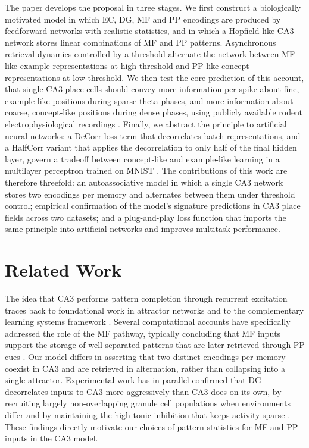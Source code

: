\documentclass[11pt]{article}
\begin{document}
The paper develops the proposal in three stages. We first construct a
biologically motivated model in which EC, DG, MF and PP encodings are
produced by feedforward networks with realistic statistics, and in which a
Hopfield-like CA3 network \cite{hopfield1982neural,tsodyks1988enhanced}
stores linear combinations of MF and PP patterns. Asynchronous retrieval
dynamics controlled by a threshold \cite{amit1985spin} alternate the network
between MF-like example representations at high threshold and PP-like
concept representations at low threshold. We then test the core prediction
of this account, that single CA3 place cells should convey more information
per spike about fine, example-like positions during sparse theta phases,
and more information about coarse, concept-like positions during dense
phases, using publicly available rodent electrophysiological recordings
\cite{mizuseki2013hc3,karlsson2015hc6}. Finally, we abstract the principle
to artificial neural networks: a DeCorr loss term that decorrelates batch
representations, and a HalfCorr variant that applies the decorrelation to
only half of the final hidden layer, govern a tradeoff between concept-like
and example-like learning in a multilayer perceptron trained on MNIST
\cite{lecun1998gradient}. The contributions of this work are therefore
threefold: an autoassociative model in which a single CA3 network stores
two encodings per memory and alternates between them under threshold
control; empirical confirmation of the model's signature predictions in CA3
place fields across two datasets; and a plug-and-play loss function that
imports the same principle into artificial networks and improves multitask
performance.

\section{Related Work}

The idea that CA3 performs pattern completion through recurrent excitation
traces back to foundational work in attractor networks
\cite{hopfield1982neural,tsodyks1988enhanced,amit1985spin} and to the
complementary learning systems framework
\cite{mcnaughton1987hippocampal,mcclelland1995why}. Several computational
accounts have specifically addressed the role of the MF pathway, typically
concluding that MF inputs support the storage of well-separated patterns that
are later retrieved through PP cues \cite{treves1992computational}. Our
model differs in asserting that two distinct encodings per memory coexist in
CA3 and are retrieved in alternation, rather than collapsing into a single
attractor. Experimental work has in parallel confirmed that DG decorrelates
inputs to CA3 more aggressively than CA3 does on its own, by recruiting
largely non-overlapping granule cell populations when environments differ
\cite{leutgeb2007pattern} and by maintaining the high tonic inhibition that
keeps activity sparse \cite{engin2015tonic}. These findings directly motivate
our choices of pattern statistics for MF and PP inputs in the CA3 model.
\end{document}
